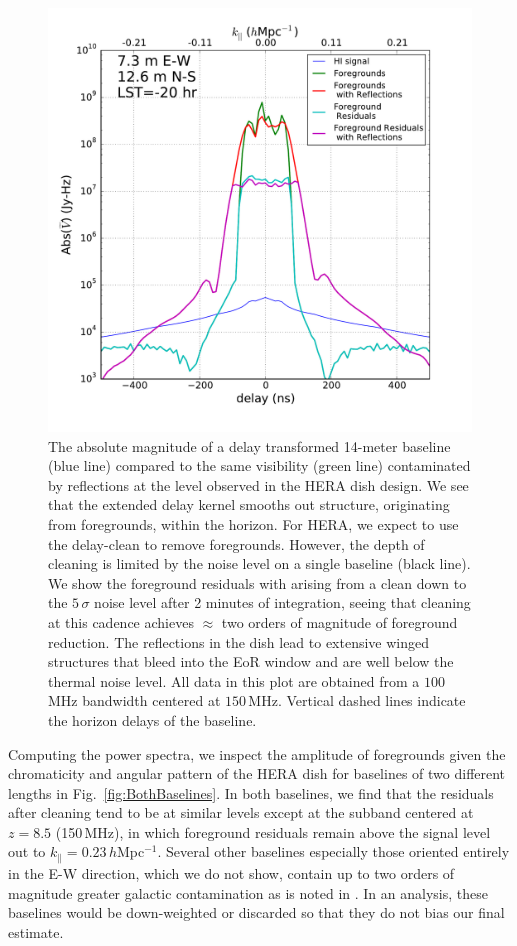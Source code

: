 \documentclass[twocolumn]{emulateapj}
\begin{document}
\begin{figure}
\includegraphics[width=.5\textwidth]{figures/cleaning_noise_Nithya.pdf}
\caption{The absolute magnitude of a delay transformed 14-meter baseline (blue line) compared to the same visibility (green line) contaminated by reflections at the level observed in the HERA dish design. We see that the extended delay kernel smooths out structure, originating from foregrounds, within the horizon. For HERA, we expect to use the delay-clean to remove foregrounds. However, the depth of cleaning is limited by the noise level on a single baseline (black line). We show the foreground residuals with arising from a clean down to the $5\,\sigma$ noise level after 2 minutes of integration, seeing that cleaning at this cadence achieves $\approx$ two orders of magnitude of foreground reduction. The reflections in the dish lead to extensive winged structures that bleed into the EoR window and are well below the thermal noise level. All data in this plot are obtained from a $100$\,MHz bandwidth centered at $150$\,MHz. Vertical dashed lines indicate the horizon delays of the baseline.}
\label{fig:Cleaning}
\end{figure}


Computing the power spectra, we inspect the amplitude of foregrounds given the chromaticity and angular pattern of the HERA dish for baselines of two different lengths in Fig.~\ref{fig:BothBaselines}. In both baselines, we find that the residuals after cleaning tend to be at similar levels except at the subband centered at $z=8.5$ (150\,MHz), in which foreground residuals remain above the signal level out to $k_\parallel=0.23$\,$h$Mpc$^{-1}$. Several other baselines especially those oriented entirely in the E-W direction, which we do not show, contain up to two orders of magnitude greater galactic  contamination as is noted in \citet{Thyagarajan:2015b}. In an analysis, these baselines would be down-weighted or discarded so that they do not bias our final estimate. 
\end{document}
